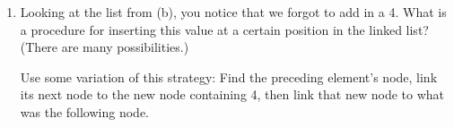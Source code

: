 \begin{enumerate}
				\vspace{1in}
            \item Looking at the list from (b), you notice that we forgot to
                  add in a 4. What is a procedure for inserting this value at a certain position in the linked list? (There are
                  many possibilities.) \\
                \begin{answer}
				Use some variation of this strategy:
				Find the preceding element's node, link its next node to the new node containing 4,
				then link that new node to what was the following node.
				\end{answer}
				\vspace{1in}
        \end{enumerate}